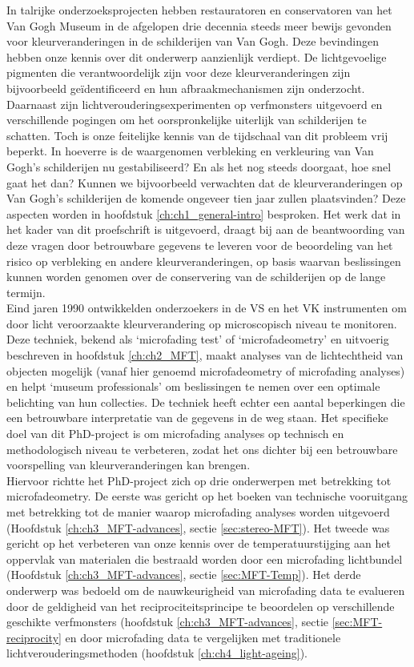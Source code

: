 In talrijke onderzoeksprojecten hebben restauratoren en conservatoren van het Van Gogh Museum in de afgelopen drie decennia steeds meer bewijs gevonden voor kleurveranderingen in de schilderijen van Van Gogh. Deze bevindingen hebben onze kennis over dit onderwerp aanzienlijk verdiept. De lichtgevoelige pigmenten die verantwoordelijk zijn voor deze kleurveranderingen zijn bijvoorbeeld geïdentificeerd en hun afbraakmechanismen zijn onderzocht. Daarnaast zijn lichtverouderingsexperimenten op verfmonsters uitgevoerd en verschillende pogingen om het oorspronkelijke uiterlijk van schilderijen te schatten. Toch is onze feitelijke kennis van de tijdschaal van dit probleem vrij beperkt. In hoeverre is de waargenomen verbleking en verkleuring van Van Gogh's schilderijen nu gestabiliseerd? En als het nog steeds doorgaat, hoe snel gaat het dan? Kunnen we bijvoorbeeld verwachten dat de kleurveranderingen op Van Gogh's schilderijen de komende ongeveer tien jaar zullen plaatsvinden? Deze aspecten worden in hoofdstuk \ref{ch:ch1_general-intro} besproken. Het werk dat in het kader van dit proefschrift is uitgevoerd, draagt bij aan de beantwoording van deze vragen door betrouwbare gegevens te leveren voor de beoordeling van het risico op verbleking en andere kleurveranderingen, op basis waarvan beslissingen kunnen worden genomen over de conservering van de schilderijen op de lange termijn.\\


Eind jaren 1990 ontwikkelden onderzoekers in de VS en het VK instrumenten om door licht veroorzaakte kleurverandering op microscopisch niveau te monitoren. Deze techniek, bekend als ‘microfading test’ of ‘microfadeometry’ en uitvoerig beschreven in hoofdstuk \ref{ch:ch2_MFT}, maakt analyses van de lichtechtheid van objecten mogelijk (vanaf hier genoemd microfadeometry of microfading analyses) en helpt ‘museum professionals’ om beslissingen te nemen over een optimale belichting van hun collecties. De techniek heeft echter een aantal beperkingen die een betrouwbare interpretatie van de gegevens in de weg staan. Het specifieke doel van dit PhD-project is om microfading analyses op technisch en methodologisch niveau te verbeteren, zodat het ons dichter bij een betrouwbare voorspelling van kleurveranderingen kan brengen. \\

Hiervoor richtte het PhD-project zich op drie onderwerpen met betrekking tot microfadeometry. De eerste was gericht op het boeken van technische vooruitgang met betrekking tot de manier waarop microfading analyses worden uitgevoerd (Hoofdstuk \ref{ch:ch3_MFT-advances}, sectie \ref{sec:stereo-MFT}). Het tweede was gericht op het verbeteren van onze kennis over de temperatuurstijging aan het oppervlak van materialen die bestraald worden door een microfading lichtbundel (Hoofdstuk \ref{ch:ch3_MFT-advances}, sectie \ref{sec:MFT-Temp}). Het derde onderwerp was bedoeld om de nauwkeurigheid van microfading data te evalueren door de geldigheid van het reciprociteitsprincipe te beoordelen op verschillende geschikte verfmonsters (hoofdstuk \ref{ch:ch3_MFT-advances}, sectie \ref{sec:MFT-reciprocity} en door microfading data te vergelijken met traditionele lichtverouderingsmethoden (hoofdstuk \ref{ch:ch4_light-ageing}).\\


